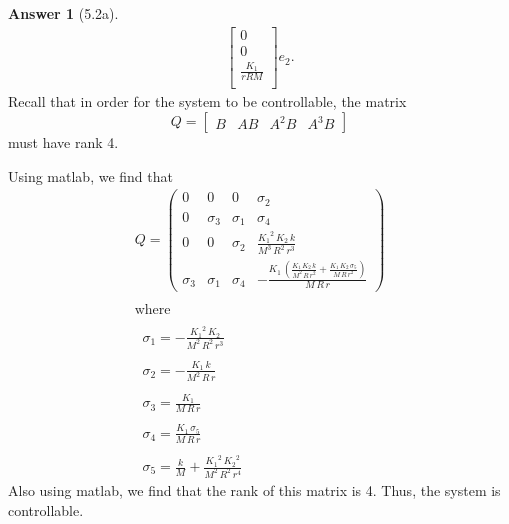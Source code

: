 \documentclass{article}
\theoremstyle{definition}
\newtheorem*{ans}{Answer}
\begin{document}
\begin{ans}[5.2a]
\begin{align*}
\begin{bmatrix}
                0 \\
                0 \\
                \frac{K_1}{rRM} \\
            \end{bmatrix}
            e_2
            .
        \end{align*}
        Recall that in order for the system to be controllable,
        the matrix 
        \begin{equation*}
            Q = 
            \begin{bmatrix}
                B & AB & A^2 B & A^3 B
            \end{bmatrix}
        \end{equation*}
        must have rank 4.

        Using matlab, we find that
        \begin{equation*}
            \begin{array}{l}
                Q = 
                \left(\begin{array}{cccc}
                0 & 0 & 0 & \sigma_2 \\
                0 & \sigma_3  & \sigma_1  & \sigma_4 \\
                0 & 0 & \sigma_2  & \frac{{K_1 }^2 \,K_2 \,k}{M^3 \,R^2 \,r^3 }\\
                \sigma_3  & \sigma_1  & \sigma_4  & -\frac{K_1 \,{\left(\frac{K_1 \,K_2 \,k}{M^2 \,R\,r^2 }+\frac{K_1 \,K_2 \,\sigma_5 }{M\,R\,r^2 }\right)}}{M\,R\,r}
                \end{array}\right)\\
                \mathrm{}\\
                \textrm{where}\\
                \mathrm{}\\
                \;\;\sigma_1 =-\frac{{K_1 }^2 \,K_2 }{M^2 \,R^2 \,r^3 }\\
                \mathrm{}\\
                \;\;\sigma_2 =-\frac{K_1 \,k}{M^2 \,R\,r}\\
                \mathrm{}\\
                \;\;\sigma_3 =\frac{K_1 }{M\,R\,r}\\
                \mathrm{}\\
                \;\;\sigma_4 =\frac{K_1 \,\sigma_5 }{M\,R\,r}\\
                \mathrm{}\\
                \;\;\sigma_5 =\frac{k}{M}+\frac{{K_1 }^2 \,{K_2 }^2 }{M^2 \,R^2 \,r^4 }
            \end{array}
        \end{equation*}
        Also using matlab, we find that the rank of this matrix is 4.
        Thus, the system is controllable.
    \end{ans}
\end{document}
